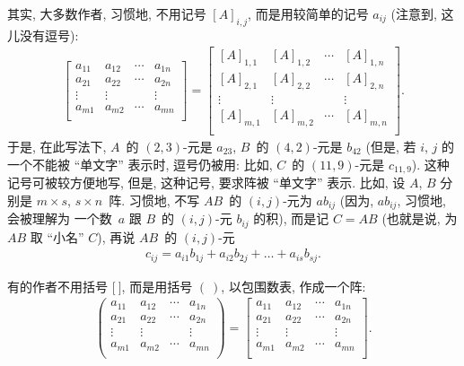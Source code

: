 其实,
大多数作者,
习惯地,
不用记号 \([A]_{i,j}\),
而是用较简单的记号 \(a_{ij}\)
(注意到, 这儿没有逗号):
\begin{align*}
    \begin{bmatrix}
        a_{11} & a_{12} & \cdots & a_{1n} \\
        a_{21} & a_{22} & \cdots & a_{2n} \\
        \vdots & \vdots & {}     & \vdots \\
        a_{m1} & a_{m2} & \cdots & a_{mn} \\
    \end{bmatrix}
    =
    \begin{bmatrix}
        [A]_{1,1} & [A]_{1,2} & \cdots & [A]_{1,n} \\
        [A]_{2,1} & [A]_{2,2} & \cdots & [A]_{2,n} \\
        \vdots    & \vdots    & {}     & \vdots    \\
        [A]_{m,1} & [A]_{m,2} & \cdots & [A]_{m,n} \\
    \end{bmatrix}.
\end{align*}
于是, 在此写法下,
\(A\)~的 \((2, 3)\)-元是 \(a_{23}\),
\(B\)~的 \((4, 2)\)-元是 \(b_{42}\)
(但是, 若 \(i\), \(j\) 的一个不能被 ``单文字'' 表示时,
逗号仍被用:
比如, \(C\)~的 \((11, 9)\)-元是 \(c_{11,9}\)).
这种记号可被较方便地写,
但是, 这种记号, 要求阵被 ``单文字'' 表示.
比如, 设 \(A\), \(B\) 分别是
\(m \times s\), \(s \times n\)~阵.
习惯地, 不写 \(AB\)~的 \((i, j)\)-元为
\({ab}_{ij}\)
(因为, \({ab}_{ij}\),
习惯地,
会被理解为
一个数~\(a\) 跟
\(B\)~的 \((i, j)\)-元 \(b_{ij}\)
的积),
而是记 \(C = AB\)
(也就是说, 为 \(AB\) 取 ``小名'' \(C\)),
再说 \(AB\)~的 \((i, j)\)-元
\begin{align*}
    c_{ij}
    = a_{i1} b_{1j} + a_{i2} b_{2j} + \dots
    + a_{is} b_{sj}.
\end{align*}

有的作者不用括号 \({[} \ {]}\),
而是用括号 \(( \ )\),
以包围数表, 作成一个阵:
\begin{align*}
    \begin{pmatrix}
        a_{11} & a_{12} & \cdots & a_{1n} \\
        a_{21} & a_{22} & \cdots & a_{2n} \\
        \vdots & \vdots & {}     & \vdots \\
        a_{m1} & a_{m2} & \cdots & a_{mn} \\
    \end{pmatrix}
    =
    \begin{bmatrix}
        a_{11} & a_{12} & \cdots & a_{1n} \\
        a_{21} & a_{22} & \cdots & a_{2n} \\
        \vdots & \vdots & {}     & \vdots \\
        a_{m1} & a_{m2} & \cdots & a_{mn} \\
    \end{bmatrix}.
\end{align*}

